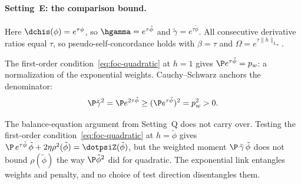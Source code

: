 \documentclass{article}
\begin{document}
\paragraph{Setting~E: the comparison bound.}
Here $\dchis(\phi) = e^{\tau\phi}$,
so $\hgamma = e^{\tau\hat\phi}$
and $\tilde\gamma = e^{\tau\tilde\phi}$.
All consecutive derivative ratios equal $\tau$,
so pseudo-self-concordance holds with $\beta = \tau$
and $\Omega = e^{\tau\|h\|_{L_\infty}}$.

The first-order condition~\eqref{eq:foc-quadratic} at $h = 1$ gives
$\P e^{\tau\tilde\phi} = p_w$:
a normalization of the exponential weights.
Cauchy--Schwarz anchors the denominator:
\begin{equation}\label{eq:tsm-entropy-denominator}
\P\tilde\gamma^2
  = \P e^{2\tau\tilde\phi}
  \ge (\P e^{\tau\tilde\phi})^2
  = p_w^2 > 0.
\end{equation}

The balance-equation argument
from Setting~Q does not carry over.
Testing the first-order condition~\eqref{eq:foc-quadratic}
at $h = \tilde\phi$ gives
$\P\,e^{\tau\tilde\phi}\,\tilde\phi
  + 2\eta\rho^2(\tilde\phi)
  = \dotpsiZ(\tilde\phi)$,
but the weighted moment
$\P\,\tilde\gamma\,\tilde\phi$
does not bound $\rho(\tilde\phi)$
the way $\P\tilde\phi^2$ did
for quadratic.
The exponential link entangles
weights and penalty,
and no choice of test direction
disentangles them.
\end{document}

